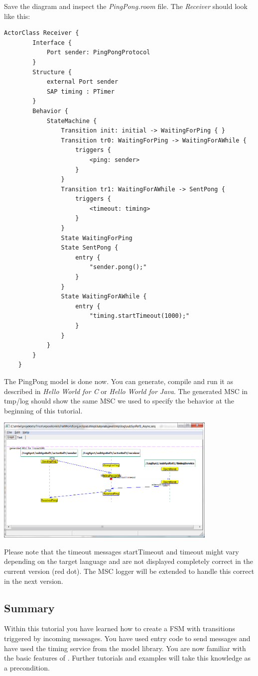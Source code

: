 Save the diagram and inspect the \emph{PingPong.room} file. The \emph{Receiver} should look like this:

\begin{lstlisting}[language=ROOM]
	ActorClass Receiver {
		Interface {
			Port sender: PingPongProtocol
		}
		Structure {
			external Port sender
			SAP timing : PTimer
		}
		Behavior {
			StateMachine {
				Transition init: initial -> WaitingForPing { }
				Transition tr0: WaitingForPing -> WaitingForAWhile {
					triggers {
						<ping: sender>
					}
				}
				Transition tr1: WaitingForAWhile -> SentPong {
					triggers {
						<timeout: timing>
					}
				}
				State WaitingForPing
				State SentPong {
					entry {
						"sender.pong();"
					}
				}
				State WaitingForAWhile {
					entry {
						"timing.startTimeout(1000);"
					}
				}
			}
		}
	}
\end{lstlisting}

The PingPong model is done now. You can generate, compile and run it as described in \emph{Hello World for C} or \emph{Hello World for Java}. The generated MSC in tmp/log should show the same MSC we used to specify the behavior at the beginning of this tutorial.

\includegraphics[width=0.8\textwidth]{images/017-01-MSC.png}

Please note that the timeout messages startTimeout and timeout might vary depending on the target language and are not displayed completely correct in the current version (red dot). The MSC logger will be extended to handle this correct in the next version.

\subsection{Summary}

Within this tutorial you have learned how to create a FSM with transitions triggered by incoming messages. You have used entry code to send messages and have used the timing service from the model library. You are now familiar with the basic features of \eTrice{}. Further tutorials and examples will take this knowledge as a precondition.
